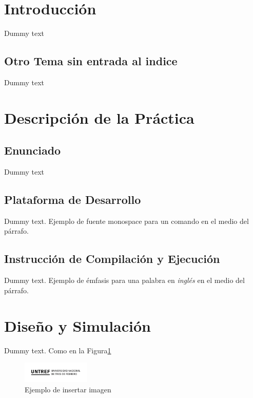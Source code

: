 \documentclass{article}
\begin{document}
\section{Introducción}
Dummy text

\subsection*{Otro Tema sin entrada al indice}
Dummy text

\section{Descripción de la Práctica}

\subsection{Enunciado}
Dummy text

\subsection{Plataforma de Desarrollo}
Dummy text. Ejemplo de fuente monospace {\ttfamily para un comando} en el medio del párrafo.

\subsection{Instrucción de Compilación y Ejecución}
Dummy text. Ejemplo de émfasis para una palabra en \textit{inglés} en el medio del párrafo.

\section{Diseño y Simulación}
Dummy text. Como en la Figura\ref{imagen}

\begin{figure}[h]
    \centering
    \includegraphics[height=1cm]{logo.png}
    \caption{Ejemplo de insertar imagen}
    \label{imagen}
\end{figure}
\clearpage 
\end{document}
